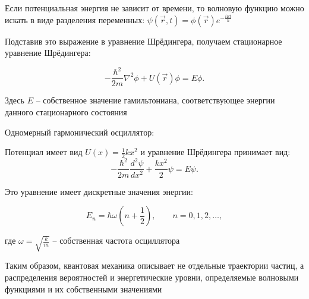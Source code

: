 \mediumvspace

Если потенциальная энергия не зависит от времени, то волновую функцию можно искать в виде разделения переменных: $\psi(\vec r, t) = \phi(\vec r)e^{-\frac{iEt}{\hbar}}$

Подставив это выражение в уравнение Шрёдингера, получаем стационарное уравнение Шрёдингера:

\[
-\frac{\hbar^2}{2m}\nabla^2 \phi + U(\vec r)\phi = E\phi.
\]

Здесь $E$ -- собственное значение гамильтониана, соответствующее энергии данного стационарного состояния

\mediumvspace

\Ex Одномерный гармонический осциллятор:

Потенциал имеет вид $U(x) = \frac{1}{2}kx^2$ и уравнение Шрёдингера принимает вид:
\[
-\frac{\hbar^2}{2m}\frac{d^2\psi}{dx^2} + \frac{kx^2}{2}\psi = E\psi.
\]

Это уравнение имеет дискретные значения энергии:

\[
E_n = \hbar\omega\left(n + \frac{1}{2}\right), \qquad n = 0, 1, 2, \ldots,
\]

где $\omega = \sqrt{\frac{k}{m}}$ -- собственная частота осциллятора

\mediumvspace

Таким образом, квантовая механика описывает не отдельные траектории частиц, а распределения вероятностей и энергетические уровни, определяемые волновыми функциями и их собственными значениями

